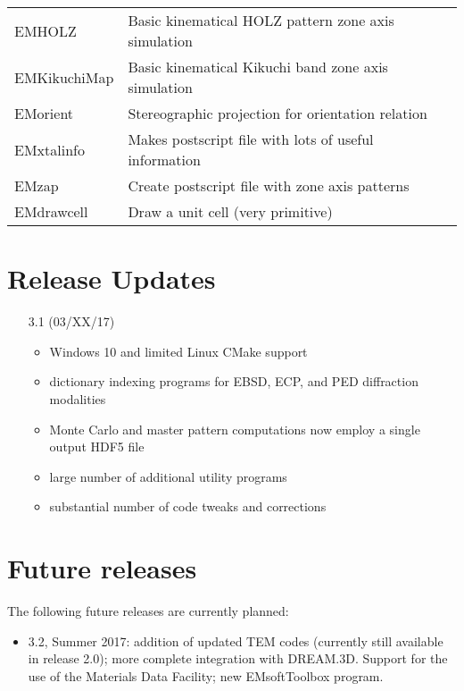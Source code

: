 \documentclass[DIV=calc, paper=letter, fontsize=11pt]{scrartcl}	 %
\begin{document}
\begin{table*}[h]
{\begin{tabular}{|l|l|c|}
  {\color{blue}\textsf{EMHOLZ}} & Basic kinematical HOLZ pattern zone axis simulation & \\
  {\color{blue}\textsf{EMKikuchiMap}} & Basic kinematical Kikuchi band zone axis simulation & \\
  \textsf{EMorient} & Stereographic projection for orientation relation & \\
  \textsf{EMxtalinfo} & Makes postscript file with lots of useful information & \\
  \textsf{EMzap} & Create postscript file with zone axis patterns & \\
  \textsf{EMdrawcell} & Draw a unit cell (very primitive) & \\
\hline
\end{tabular}}
\end{table*}

\clearpage
\section{Release Updates}
\begin{itemize}
	\item [3.1] (03/XX/17) \begin{itemize}
		\item Windows 10 and limited Linux CMake support
		\item dictionary indexing programs for EBSD, ECP, and PED diffraction modalities
		\item Monte Carlo and master pattern computations now employ a single output HDF5 file
		\item large number of additional utility programs
		\item substantial number of code tweaks and corrections
	\end{itemize}
\end{itemize}


\section{Future releases}
The following future releases are currently planned:
\begin{itemize}
	\item 3.2, Summer 2017: addition of updated TEM codes (currently still available in release 2.0); more complete integration with DREAM.3D.
	Support for the use of the Materials Data Facility; new EMsoftToolbox program.
\end{itemize}
\end{document}
